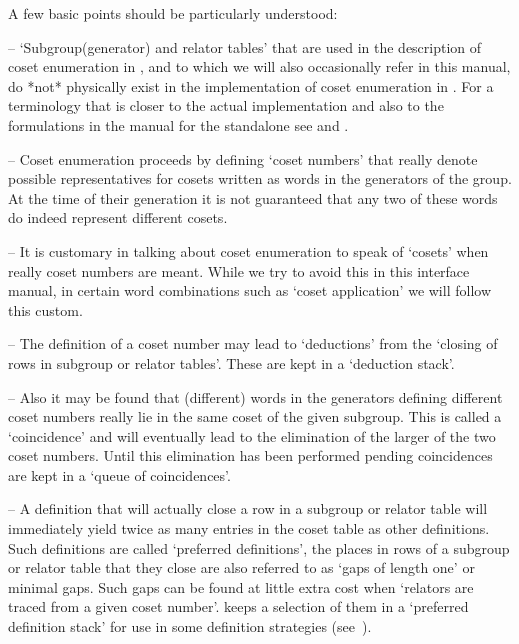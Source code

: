 A few basic points should be particularly understood:

\beginlist

\item{--} \lq{}Subgroup(generator) and relator tables' that  are  used
in the description of coset enumeration in \cite{Neu82}, and to  which
we will also occasionally refer in this manual,  do  *not*  physically
exist in the implementation of coset  enumeration  in  {\ACE}.  For  a
terminology that is closer to the actual implementation  and  also  to
the  formulations  in  the  manual  for  the  {\ACE}  standalone   see
\cite{CDHW73} and \cite{Hav91}.

\item{--} Coset enumeration proceeds by defining  \lq{}coset  numbers'
that really denote possible  representatives  for  cosets  written  as
words in the generators of the group. At the time of their  generation
it is not guaranteed that any two of these words do  indeed  represent
different cosets.

\item{--} It is customary in  talking about coset enumeration to speak
of \lq{}cosets' when really coset  numbers are meant. While  we try to
avoid this in this interface manual, in certain word combinations such
as \lq{}coset application' we will follow this custom.

\item{--} The   definition   of   a   coset   number   may   lead   to
\lq{}deductions' from the \lq{}closing of rows in subgroup or  relator
tables'. These are kept in a \lq{}deduction stack'.

\item{--} Also   it  may  be  found  that  (different)  words  in  the
generators defining different coset numbers really  lie  in  the  same
coset of the given subgroup. This is called  a  \lq{}coincidence'  and
will eventually lead to the elimination of the larger of the two coset
numbers.  Until  this   elimination   has   been   performed   pending
coincidences are kept in a \lq{}queue of coincidences'.

\item{--} A definition that will actually close a row in a subgroup or
relator table will immediately yield twice  as  many  entries  in  the
coset  table  as  other  definitions.  Such  definitions  are   called
\lq{}preferred definitions', the places  in  rows  of  a  subgroup  or
relator table that they close are also referred  to  as  \lq{}gaps  of
length one' or minimal gaps. Such gaps can be found  at  little  extra
cost when \lq{}relators are traced from a given coset number'.  {\ACE}
keeps a selection of them in a \lq{}preferred  definition  stack'  for
use in some definition strategies (see~\cite{Hav91}).

